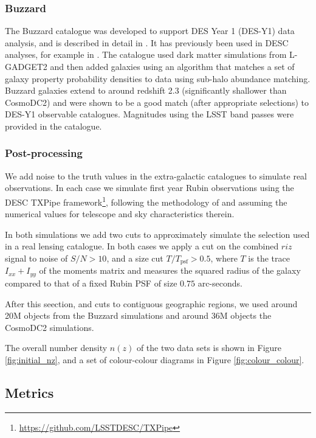 \documentclass[twocolumn,twocolappendix]{aastex63}
\begin{document}
\subsubsection{Buzzard}

The Buzzard catalogue was developed to support DES Year 1 (DES-Y1)
data analysis, and is described in detail in \citet{buzzard}.
It has previously been used in DESC analyses, for example in \citet{dc1_pz}.
The catalogue used dark
matter simulations from L-GADGET2 \cite{gadget2} and then added galaxies using
an algorithm that matches a set of galaxy
property probability densities to data using sub-halo abundance matching. 
Buzzard galaxies extend to around redshift 2.3 (significantly shallower than CosmoDC2)
and were shown to be a good
match (after appropriate selections) to DES-Y1 observable catalogues.  Magnitudes
using the LSST band passes were provided in the catalogue.

\subsubsection{Post-processing} \label{sec:data-proc}

We add noise to the truth values in the extra-galactic catalogues to simulate real observations.
In each case we simulate first year Rubin observations
using the DESC {\sc TXPipe} framework\footnote{\url{https://github.com/LSSTDESC/TXPipe}}, following the methodology of \citet{ivezic_jones_lupton}
and assuming the numerical values for telescope and sky characteristics therein.

In both simulations we add two cuts to approximately simulate the selection used in a real
lensing catalogue.  In both cases we apply a cut on the combined $riz$ signal to noise of
$S/N > 10$, and a size cut $T / T_\mathrm{psf} > 0.5$, where
$T$ is the trace $I_{xx} + I_{yy}$ of the moments matrix and measures the squared radius of the
galaxy compared to that of a fixed Rubin PSF of size $0.75$ arc-seconds.

After this seection, and cuts to contiguous geographic regions, we used around 20M objects from the Buzzard
simulations and around 36M objects the CosmoDC2 simulations.


The overall number density $n(z)$ of the two data sets is shown in Figure \ref{fig:initial_nz},
and a set of colour-colour diagrams  in Figure \ref{fig:colour_colour}.

\subsection{Metrics}
\label{sec:metrics}
\end{document}
